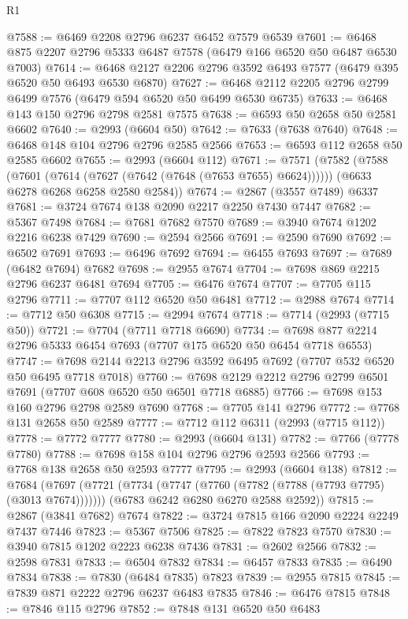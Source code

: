 \begin{lexlean}{R1}
\begin{coremodule}
@7588 := @6469 @2208 @2796 @6237 @6452 @7579 @6539
@7601 := @6468 @875 @2207 @2796 @5333 @6487 @7578 (@6479 @166 @6520 @50 @6487 @6530 @7003)
@7614 := @6468 @2127 @2206 @2796 @3592 @6493 @7577 (@6479 @395 @6520 @50 @6493 @6530 @6870)
@7627 := @6468 @2112 @2205 @2796 @2799 @6499 @7576 (@6479 @594 @6520 @50 @6499 @6530 @6735)
@7633 := @6468 @143 @150 @2796 @2798 @2581 @7575
@7638 := @6593 @50 @2658 @50 @2581 @6602
@7640 := @2993 (@6604 @50)
@7642 := @7633 (@7638 @7640)
@7648 := @6468 @148 @104 @2796 @2796 @2585 @2566
@7653 := @6593 @112 @2658 @50 @2585 @6602
@7655 := @2993 (@6604 @112)
@7671 := @7571
    (@7582
      (@7588 (@7601 (@7614 (@7627 (@7642 (@7648 (@7653 @7655) @6624))))))
      (@6633 @6278 @6268 @6258 @2580 @2584))
@7674 := @2867 (@3557 @7489) @6337
@7681 := @3724 @7674 @138 @2090 @2217 @2250 @7430 @7447
@7682 := @5367 @7498
@7684 := @7681 @7682 @7570
@7689 := @3940 @7674 @1202 @2216 @6238 @7429
@7690 := @2594 @2566
@7691 := @2590 @7690
@7692 := @6502 @7691
@7693 := @6496 @7692
@7694 := @6455 @7693
@7697 := @7689 (@6482 @7694) @7682
@7698 := @2955 @7674
@7704 := @7698 @869 @2215 @2796 @6237 @6481 @7694
@7705 := @6476 @7674
@7707 := @7705 @115 @2796
@7711 := @7707 @112 @6520 @50 @6481
@7712 := @2988 @7674
@7714 := @7712 @50 @6308
@7715 := @2994 @7674
@7718 := @7714 (@2993 (@7715 @50))
@7721 := @7704 (@7711 @7718 @6690)
@7734 := @7698 @877 @2214 @2796 @5333 @6454 @7693 (@7707 @175 @6520 @50 @6454 @7718 @6553)
@7747 := @7698 @2144 @2213 @2796 @3592 @6495 @7692 (@7707 @532 @6520 @50 @6495 @7718 @7018)
@7760 := @7698 @2129 @2212 @2796 @2799 @6501 @7691 (@7707 @608 @6520 @50 @6501 @7718 @6885)
@7766 := @7698 @153 @160 @2796 @2798 @2589 @7690
@7768 := @7705 @141 @2796
@7772 := @7768 @131 @2658 @50 @2589
@7777 := @7712 @112 @6311 (@2993 (@7715 @112))
@7778 := @7772 @7777
@7780 := @2993 (@6604 @131)
@7782 := @7766 (@7778 @7780)
@7788 := @7698 @158 @104 @2796 @2796 @2593 @2566
@7793 := @7768 @138 @2658 @50 @2593 @7777
@7795 := @2993 (@6604 @138)
@7812 := @7684
    (@7697
      (@7721 (@7734 (@7747 (@7760 (@7782 (@7788 (@7793 @7795) (@3013 @7674)))))))
      (@6783 @6242 @6280 @6270 @2588 @2592))
@7815 := @2867 (@3841 @7682) @7674
@7822 := @3724 @7815 @166 @2090 @2224 @2249 @7437 @7446
@7823 := @5367 @7506
@7825 := @7822 @7823 @7570
@7830 := @3940 @7815 @1202 @2223 @6238 @7436
@7831 := @2602 @2566
@7832 := @2598 @7831
@7833 := @6504 @7832
@7834 := @6457 @7833
@7835 := @6490 @7834
@7838 := @7830 (@6484 @7835) @7823
@7839 := @2955 @7815
@7845 := @7839 @871 @2222 @2796 @6237 @6483 @7835
@7846 := @6476 @7815
@7848 := @7846 @115 @2796
@7852 := @7848 @131 @6520 @50 @6483

\end{coremodule}
\end{lexlean}

